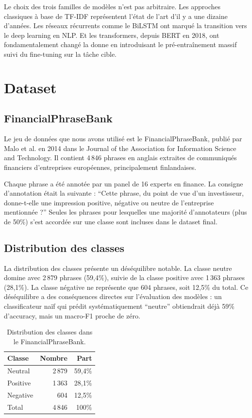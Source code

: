 \documentclass[12pt, a4paper]{article}
\begin{document}
Le choix des trois familles de modèles n'est pas arbitraire. Les approches classiques
à base de TF-IDF représentent l'état de l'art d'il y a une dizaine d'années. Les
réseaux récurrents comme le BiLSTM ont marqué la transition vers le deep learning
en NLP. Et les transformers, depuis BERT en 2018, ont fondamentalement changé la
donne en introduisant le pré-entraînement massif suivi du fine-tuning sur la tâche
cible.

\section{Dataset}

\subsection{FinancialPhraseBank}

Le jeu de données que nous avons utilisé est le FinancialPhraseBank, publié par
Malo et al. en 2014 dans le Journal of the Association for Information Science and
Technology. Il contient 4\,846 phrases en anglais extraites de communiqués financiers
d'entreprises européennes, principalement finlandaises.

Chaque phrase a été annotée par un panel de 16 experts en finance. La consigne
d'annotation était la suivante : ``Cette phrase, du point de vue d'un investisseur,
donne-t-elle une impression positive, négative ou neutre de l'entreprise mentionnée ?''
Seules les phrases pour lesquelles une majorité d'annotateurs (plus de 50\%) s'est
accordée sur une classe sont incluses dans le dataset final.

\subsection{Distribution des classes}

La distribution des classes présente un déséquilibre notable. La classe neutre domine
avec 2\,879 phrases (59,4\%), suivie de la classe positive avec 1\,363 phrases (28,1\%).
La classe négative ne représente que 604 phrases, soit 12,5\% du total. Ce déséquilibre
a des conséquences directes sur l'évaluation des modèles : un classificateur naïf qui
prédit systématiquement ``neutre'' obtiendrait déjà 59\% d'accuracy, mais un macro-F1
proche de zéro.

\begin{table}[h]
  \centering
  \begin{tabular}{lrr}
    \toprule
    Classe   & Nombre & Part \\
    \midrule
    Neutral  & 2\,879 & 59,4\% \\
    Positive & 1\,363 & 28,1\% \\
    Negative &    604 & 12,5\% \\
    \midrule
    Total    & 4\,846 & 100\% \\
    \bottomrule
  \end{tabular}
  \caption{Distribution des classes dans le FinancialPhraseBank.}
\end{table}
\end{document}
